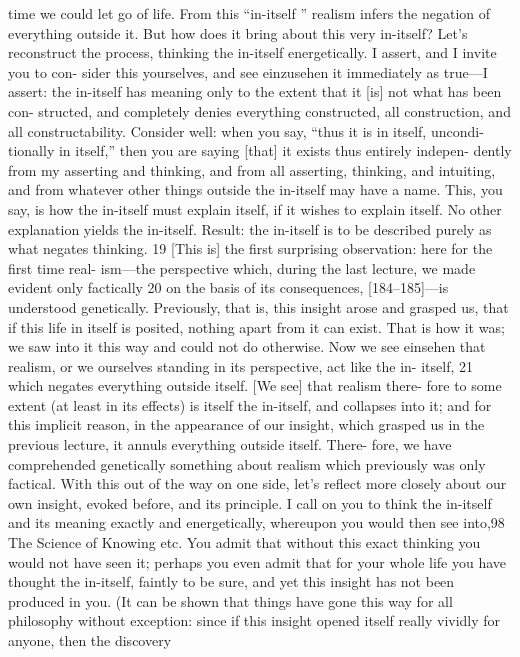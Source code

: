 time we could let go of life. From this “in-itself ” realism infers the negation
of everything outside it.
But how does it bring about this very in-itself? Let’s reconstruct the
process, thinking the in-itself energetically. I assert, and I invite you to con-
sider this yourselves, and see {einzusehen} it immediately as true—I assert: the
in-itself has meaning only to the extent that it [is] not what has been con-
structed, and completely denies everything constructed, all construction, and
all constructability. Consider well: when you say, “thus it is in itself, uncondi-
tionally in itself,” then you are saying [that] it exists thus entirely indepen-
dently from my asserting and thinking, and from all asserting, thinking, and
intuiting, and from whatever other things outside the in-itself may have a
name. This, you say, is how the in-itself must explain itself, if it wishes to
explain itself. No other explanation yields the in-itself. Result: the in-itself is
to be described purely as what negates thinking. 19
[This is] the first surprising observation: here for the first time real-
ism—the perspective which, during the last lecture, we made evident only
factically 20 on the basis of its consequences, [184–185]—is understood
genetically. Previously, that is, this insight arose and grasped us, that if this
life in itself is posited, nothing apart from it can exist. That is how it was;
we saw into it this way and could not do otherwise. Now we see {einsehen}
that realism, or we ourselves standing in its perspective, act like the in-
itself, 21 which negates everything outside itself. [We see] that realism there-
fore to some extent (at least in its effects) is itself the in-itself, and collapses
into it; and for this implicit reason, in the appearance of our insight, which
grasped us in the previous lecture, it annuls everything outside itself. There-
fore, we have comprehended genetically something about realism which
previously was only factical.
With this out of the way on one side, let’s reflect more closely about our
own insight, evoked before, and its principle. I call on you to think the in-itself
and its meaning exactly and energetically, whereupon you would then see into,98
The Science of Knowing
etc. You admit that without this exact thinking you would not have seen it;
perhaps you even admit that for your whole life you have thought the in-itself,
faintly to be sure, and yet this insight has not been produced in you. (It can be
shown that things have gone this way for all philosophy without exception:
since if this insight opened itself really vividly for anyone, then the discovery

